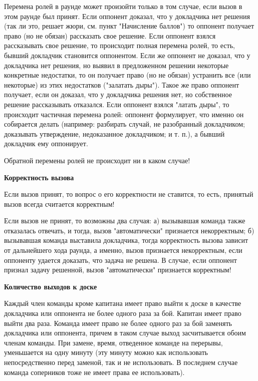 \documentclass{article}
\begin{document}
Перемена ролей в раунде может произойти только в том случае, если вызов в этом раунде был принят. Если оппонент доказал, что у докладчика нет решения (так ли это, решает жюри, см. пункт "Начисление баллов") то оппонент получает право (но не обязан) рассказать свое решение. Если оппонент взялся рассказывать свое решение, то происходит полная перемена ролей, то есть, бывший докладчик становится оппонентом. Если же оппонент не доказал, что у докладчика нет решения, но выявил в предложенном решении некоторые конкретные недостатки, то он получает право (но не обязан) устранить все (или некоторые) из этих недостатков ("залатать дыры"). Такое же право оппонент получает, если он доказал, что у докладчика решения нет, но собственное решение рассказывать отказался. Если оппонент взялся "латать дыры", то происходит частичная перемена ролей: оппонент формулирует, что именно он собирается делать (например: разбирать случай, не разобранный докладчиком; доказывать утверждение, недоказанное докладчиком; и т. п.), а бывший докладчик ему оппонирует.

Обратной перемены ролей не происходит ни в каком случае!

\begin{center}
	\textbf{Корректность вызова}
\end{center}
Если вызов принят, то вопрос о его корректности не ставится, то есть, принятый вызов всегда считается корректным!

Если вызов не принят, то возможны два случая: 
а) вызывавшая команда также отказалась отвечать, и тогда, вызов "автоматически" признается некорректным; 
б) вызывавшая команда выставила докладчика, тогда корректность вызова зависит от дальнейшего хода раунда, а именно, вызов признается некорректным, если оппоненту удается доказать, что задача не решена. В случае, если оппонент признал задачу решенной, вызов "автоматически" признается корректным!

\begin{center}
\textbf{Количество выходов к доске}
\end{center}

Каждый член команды кроме капитана имеет право выйти к доске в качестве докладчика или оппонента не более одного раза за бой. Капитан имеет право выйти два раза. Команда имеет право не более одного раз за бой заменять докладчика или оппонента, причем в таком случае выход засчитывается обоим членам команды. При замене, время, отведенное команде на перерывы, уменьшается на одну минуту (эту минуту можно как использовать непосредственно перед заменой, так и не использовать. В последнем случае команда соперников тоже не имеет права ее использовать).
\end{document}
